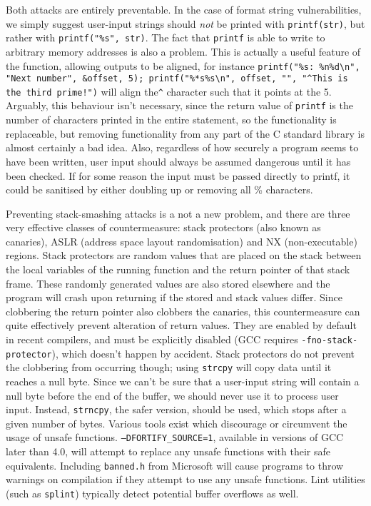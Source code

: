 Both attacks are entirely preventable. In the case of format string vulnerabilities, we simply suggest user-input
strings should \emph{not} be printed with {\tt printf(str)}, but rather with {\tt printf("\%s", str)}. The fact that
{\tt printf} is able to write to arbitrary memory addresses is also a problem. This is actually a useful feature of the
function, allowing outputs to be aligned, for instance {\tt printf("\%s: \%n\%d\textbackslash n", "Next number",
\&offset, 5); printf("\%*s\%s\textbackslash n", offset, "", "\textasciicircum This is the third prime!")} will align
the{\tt \textasciicircum} character such that it points at the 5. Arguably, this behaviour isn't necessary, since the
return value of {\tt printf} is the number of characters printed in the entire statement, so the functionality is
replaceable, but removing functionality from any part of the C standard library is almost certainly a bad idea. Also,
regardless of how securely a program seems to have been written, user input should always be assumed dangerous until it
has been checked. If for some reason the input must be passed directly to printf, it could be sanitised by either
doubling up or removing all \% characters.

Preventing stack-smashing attacks is a not a new problem, and there are three very effective classes of countermeasure:
stack protectors (also known as canaries), ASLR (address space layout randomisation) and NX (non-executable) regions.
Stack protectors are random values that are placed on the stack between the local variables of the running function and
the return pointer of that stack frame. These randomly generated values are also stored elsewhere and the program will
crash upon returning if the stored and stack values differ. Since clobbering the return pointer also clobbers the
canaries, this countermeasure can quite effectively prevent alteration of return values. They are enabled by default in
recent compilers, and must be explicitly disabled (GCC requires {\tt -fno-stack-protector}), which doesn't happen by
accident. Stack protectors do not prevent the clobbering from occurring though; using {\tt strcpy} will copy data until
it reaches a null byte. Since we can't be sure that a user-input string will contain a null byte before the end of the
buffer, we should never use it to process user input. Instead, {\tt strncpy}, the safer version, should be used, which
stops after a given number of bytes. Various tools exist which discourage or circumvent the usage of unsafe functions.
{\tt --DFORTIFY\_SOURCE=1}\cite{fort_source}, available in versions of GCC later than 4.0, will attempt to replace any
unsafe functions with their safe equivalents. Including {\tt banned.h} from Microsoft\cite{banned} will cause programs
to throw warnings on compilation if they attempt to use any unsafe functions. Lint utilities (such as {\tt splint})
typically detect potential buffer overflows as well.

